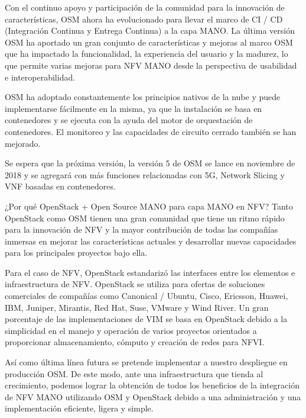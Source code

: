 Con el continuo apoyo y participación de la comunidad para la innovación de características, OSM ahora ha evolucionado para llevar el marco de CI / CD (Integración Continua y Entrega Continua) a la capa MANO. La última versión OSM ha aportado un gran conjunto de características y mejoras al marco OSM que ha impactado la funcionalidad, la experiencia del usuario y la madurez, lo que permite varias mejoras para NFV MANO desde la perspectiva de usabilidad e interoperabilidad.

OSM ha adoptado constantemente los principios nativos de la nube y puede implementarse fácilmente en la misma, ya que la instalación se basa en contenedores y se ejecuta con la ayuda del motor de orquestación de contenedores. El monitoreo y las capacidades de circuito cerrado también se han mejorado.

Se espera que la próxima versión, la versión 5 de OSM se lance en noviembre de 2018 y se agregará con más funciones relacionadas con 5G, Network Slicing y VNF basadas en contenedores.

¿Por qué OpenStack + Open Source MANO para capa MANO en NFV? Tanto OpenStack como OSM tienen una gran comunidad que tiene un ritmo rápido para la innovación de NFV y la mayor contribución de todas las compañías inmersas en mejorar las características actuales y desarrollar nuevas capacidades para los principales proyectos bajo ella.

Para el caso de NFV, OpenStack estandarizó las interfaces entre los elementos e infraestructura de NFV. OpenStack se utiliza para ofertas de soluciones comerciales de compañías como Canonical / Ubuntu, Cisco, Ericsson, Huawei, IBM, Juniper, Mirantis, Red Hat, Suse, VMware y Wind River. Un gran porcentaje de las implementaciones de VIM se basa en OpenStack debido a la simplicidad en el manejo y operación de varios proyectos orientados a proporcionar almacenamiento, cómputo y creación de redes para NFVI.

Así como última línea futura se pretende implementar a nuestro despliegue en producción OSM. De este modo, ante una infraestructura que tienda al crecimiento, podemos lograr la obtención de todos los beneficios de la integración de NFV MANO utilizando OSM y OpenStack debido a una administración y una implementación eficiente, ligera y simple.

